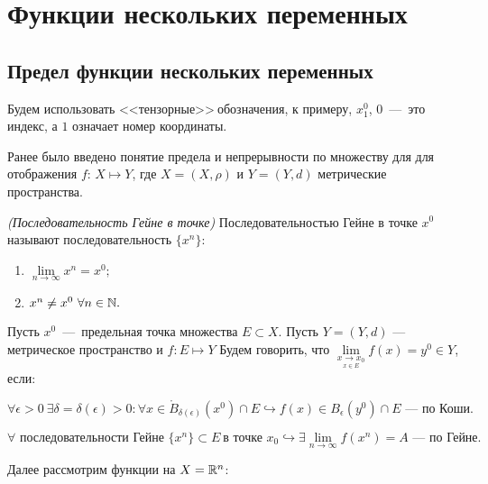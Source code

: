 \section{Функции нескольких переменных}

\subsection{Предел функции нескольких переменных}

Будем использовать <<тензорные>>$\ $обозначения, к примеру, $x^0 _1$, $0$~---~это индекс, а $1$ означает номер координаты.

Ранее было введено понятие предела и непрерывности по множеству для для отображения $f$: $X \mapsto Y$, где $X = (X, \rho)$ и $Y = (Y, d)$ метрические пространства.

\begin{definition}
    \textit{(Последовательность Гейне в точке)} Последовательностью Гейне в точке $x^0$ называют последовательность $\{x^n\}$:

        \begin{enumerate}
        \item $\lim\limits_{n\to \infty} x^{n} = x^{0};$
        \item $x^{n} \neq x^{0} \  \forall n \in \mathbb{N}.$
    \end{enumerate}
\end{definition}

\begin{definition}
    Пусть $x^{0}$~---~предельная точка множества $E \subset X$. Пусть $Y = (Y, d)$ — метрическое пространство и $f: E \mapsto Y$ 
    Будем говорить, что $\lim\limits_{\underset{x \in E}{x\to x_{0}}} f (x) = y^{0} \in Y$, если:

    $$ \forall \epsilon > 0 \  \exists \delta =  \delta (\epsilon) > 0: \forall x \in \mathring{B}_{\delta (\epsilon)} (x^{0}) \cap E \hookrightarrow f (x) \in B_{\epsilon} (y^{0}) \cap E \text{~---~по Коши.}$$

    

    $$ \forall \text{ последовательности Гейне }\{ x^{n}\} \subset E \  \text{в точке } x_{0} \hookrightarrow  \exists  \lim\limits_{n\to \infty} f (x^{n}) = A\text{~---~по Гейне.}$$
        
\end{definition}

Далее рассмотрим функции на $X = \mathbb{R} ^n$:

